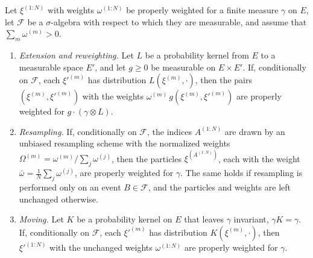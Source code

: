 \begin{lemma}
    \label{lem:proper_weighting_operations}
    Let $\xi^{(1:N)}$ with weights $\omega^{(1:N)}$ be properly weighted for a finite measure $\gamma$ on $E$, let $\mathcal{F}$ be a $\sigma$-algebra with respect to which they are measurable, and assume that $\sum_m\omega^{(m)}>0$.
    \begin{enumerate}
        \item \emph{Extension and reweighting.} Let $L$ be a probability kernel from $E$ to a measurable space $E'$, and let $g\ge0$ be measurable on $E\times E'$. If, conditionally on $\mathcal{F}$, each $\xi'^{(m)}$ has distribution $L(\xi^{(m)},\cdot)$, then the pairs $(\xi^{(m)},\xi'^{(m)})$ with the weights $\omega^{(m)}\,g(\xi^{(m)},\xi'^{(m)})$ are properly weighted for $g\cdot(\gamma\otimes L)$.
        \item \emph{Resampling.} If, conditionally on $\mathcal{F}$, the indices $A^{(1:N)}$ are drawn by an unbiased resampling scheme with the normalized weights $\Omega^{(m)} = \omega^{(m)}/\sum_j\omega^{(j)}$, then the particles $\xi^{(A^{(1:N)})}$, each with the weight $\bar{\omega} = \frac{1}{N}\sum_j\omega^{(j)}$, are properly weighted for $\gamma$. The same holds if resampling is performed only on an event $B\in\mathcal{F}$, and the particles and weights are left unchanged otherwise.
        \item \emph{Moving.} Let $K$ be a probability kernel on $E$ that leaves $\gamma$ invariant, $\gamma K = \gamma$. If, conditionally on $\mathcal{F}$, each $\xi'^{(m)}$ has distribution $K(\xi^{(m)},\cdot)$, then $\xi'^{(1:N)}$ with the unchanged weights $\omega^{(1:N)}$ are properly weighted for $\gamma$.
    \end{enumerate}
\end{lemma}
